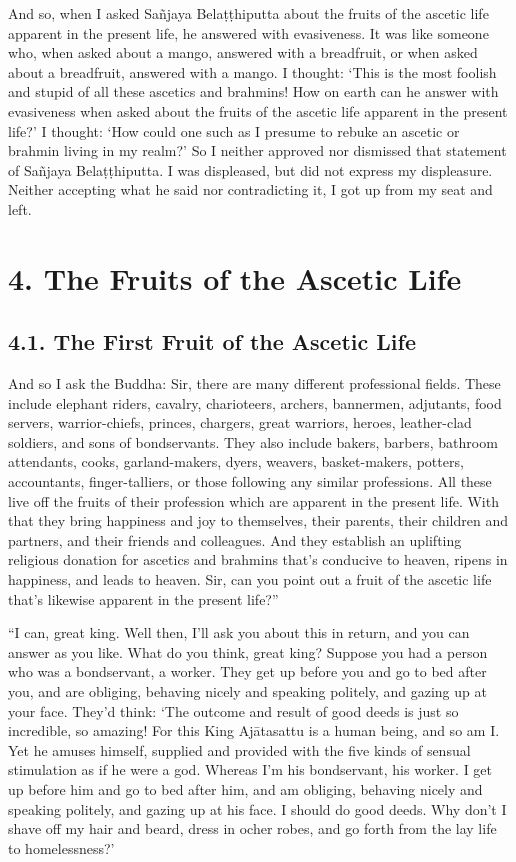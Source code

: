 \documentclass[12pt,openany]{book}%
\begin{document}
And so, when I asked \textsanskrit{Sañjaya} \textsanskrit{Belaṭṭhiputta} about the fruits of the ascetic life apparent in the present life, he answered with evasiveness. It was like someone who, when asked about a mango, answered with a breadfruit, or when asked about a breadfruit, answered with a mango. I thought: ‘This is the most foolish and stupid of all these ascetics and brahmins! How on earth can he answer with evasiveness when asked about the fruits of the ascetic life apparent in the present life?’ I thought: ‘How could one such as I presume to rebuke an ascetic or brahmin living in my realm?’ So I neither approved nor dismissed that statement of \textsanskrit{Sañjaya} \textsanskrit{Belaṭṭhiputta}. I was displeased, but did not express my displeasure. Neither accepting what he said nor contradicting it, I got up from my seat and left. 

\section*{4. The Fruits of the Ascetic Life }

\subsection*{4.1. The First Fruit of the Ascetic Life }

And so I ask the Buddha: Sir, there are many different professional fields. These include elephant riders, cavalry, charioteers, archers, bannermen, adjutants, food servers, warrior-chiefs, princes, chargers, great warriors, heroes, leather-clad soldiers, and sons of bondservants. They also include bakers, barbers, bathroom attendants, cooks, garland-makers, dyers, weavers, basket-makers, potters, accountants, finger-talliers, or those following any similar professions. All these live off the fruits of their profession which are apparent in the present life. With that they bring happiness and joy to themselves, their parents, their children and partners, and their friends and colleagues. And they establish an uplifting religious donation for ascetics and brahmins that’s conducive to heaven, ripens in happiness, and leads to heaven. Sir, can you point out a fruit of the ascetic life that’s likewise apparent in the present life?” 

“I can, great king. Well then, I’ll ask you about this in return, and you can answer as you like. What do you think, great king? Suppose you had a person who was a bondservant, a worker. They get up before you and go to bed after you, and are obliging, behaving nicely and speaking politely, and gazing up at your face. They’d think: ‘The outcome and result of good deeds is just so incredible, so amazing! For this King \textsanskrit{Ajātasattu} is a human being, and so am I. Yet he amuses himself, supplied and provided with the five kinds of sensual stimulation as if he were a god. Whereas I’m his bondservant, his worker. I get up before him and go to bed after him, and am obliging, behaving nicely and speaking politely, and gazing up at his face. I should do good deeds. Why don’t I shave off my hair and beard, dress in ocher robes, and go forth from the lay life to homelessness?’ 
\end{document}

